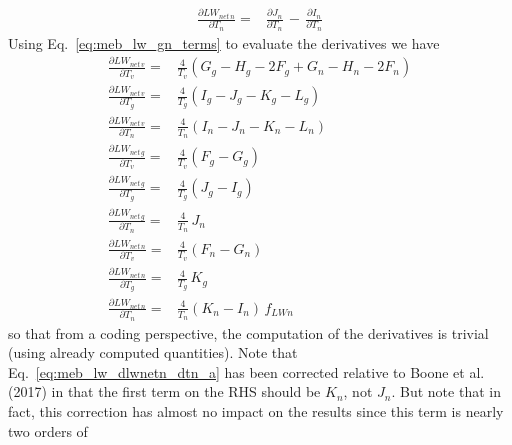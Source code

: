 {\begin{subequations}
\begin{align}
\\
 \label{eq:meb_lw_dlwnetn_dtn}
{\frac{\partial LW_{net\,n}}{\partial T_n}} = & 
       {\frac{\partial J_{n}}{\partial T_n}}  
\,-\,  {\frac{\partial I_{n}}{\partial T_n}}  
%
\end{align}
\end{subequations}
%
Using Eq.~\ref{eq:meb_lw_gn_terms} to evaluate the derivatives we have
%
\begin{subequations}\label{eq:meb_lw_gn_terms_derivs_a}
\begin{align}
 \label{eq:meb_lw_dlwnetv_dtv_a}
{\frac{\partial LW_{net\,v}}{\partial T_v}} = & 
{\frac{4}{T_v}}\left(G_{g}- H_{g}-2F_{g}+G_{n}- H_{n}-2F_{n}\right)
\\
 \label{eq:meb_lw_dlwnetv_dtg_a}
{\frac{\partial LW_{net\,v}}{\partial T_g}} = & 
{\frac{4}{T_g}}\left(I_{g}-J_{g}-K_{g}-L_{g}\right)
\\
 \label{eq:meb_lw_dlwnetv_dtn_a}
{\frac{\partial LW_{net\,v}}{\partial T_n}} = & 
{\frac{4}{T_n}}\left(I_{n}-J_{n}-K_{n}-L_{n}\right)
\\
 \label{eq:meb_lw_dlwnetg_dtv_a}
{\frac{\partial LW_{net\,g}}{\partial T_v}} = & 
{\frac{4}{T_v}}\left(F_{g}-G_{g}\right)
\\
 \label{eq:meb_lw_dlwnetg_dtg_a}
{\frac{\partial LW_{net\,g}}{\partial T_g}} = & 
{\frac{4}{T_g}}\left(J_{g}-I_{g}\right)
\\
 \label{eq:meb_lw_dlwnetg_dtn_a}
{\frac{\partial LW_{net\,g}}{\partial T_n}} = & 
{\frac{4}{T_n}}\,J_{n}
\\
 \label{eq:meb_lw_dlwnetn_dtv_a}
{\frac{\partial LW_{net\,n}}{\partial T_v}} = & 
{\frac{4}{T_v}}\left(F_{n}-G_{n}\right)
\\
 \label{eq:meb_lw_dlwnetn_dtg_a}
{\frac{\partial LW_{net\,n}}{\partial T_g}} = & 
{\frac{4}{T_g}}\,K_{g}
\\
 \label{eq:meb_lw_dlwnetn_dtn_a}
{\frac{\partial LW_{net\,n}}{\partial T_n}} = & 
{\frac{4}{T_n}}\left(K_{n}-I_{n}\right) \, f_{LWn}
%
\end{align}
\end{subequations}
%
so that from a coding perspective, the computation of the derivatives
is trivial (using already computed quantities).
%
Note that Eq.~\ref{eq:meb_lw_dlwnetn_dtn_a} has been corrected
relative to Boone et al. (2017)\nocite{boone_ea_2017} in that the
first term on the RHS should be $K_n$, not $J_n$. But note that in
fact, this correction has almost
no impact on the results since this term is nearly two orders of
}
